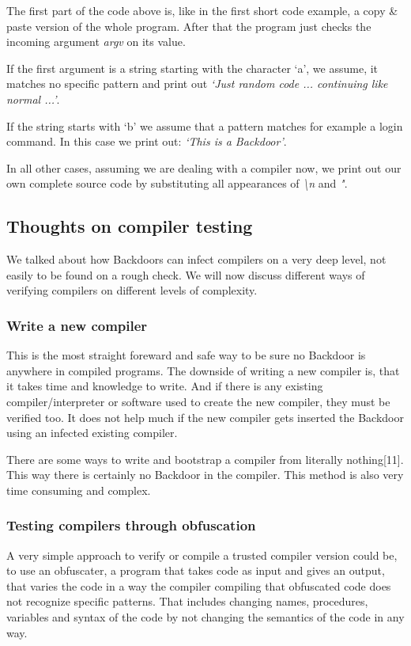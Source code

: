 \documentclass[a4paper, 12pt]{article}
\begin{document}
The first part of the code above is, like in the first short code example, a copy \& paste version of the whole program. After that the program just checks the incoming argument \emph{argv} on its value.

If the first argument is a string starting with the character `a', we assume, it matches no specific pattern and print out \emph{`Just random code ... continuing like normal ...'}.

If the string starts with `b' we assume that a pattern matches for example a login command. In this case we print out: \emph{`This is a Backdoor'}.

In all other cases, assuming we are dealing with a compiler now, we print out our own complete source code by substituting all appearances of \emph{\textbackslash n} and \emph{"}.

\subsection{Thoughts on compiler testing}

We talked about how Backdoors can infect compilers on a very deep level, not easily to be found on a rough check. We will now discuss different ways of verifying compilers on different levels of complexity.

\subsubsection{Write a new compiler}

This is the most straight foreward and safe way to be sure no Backdoor is anywhere in compiled programs. The downside of writing a new compiler is, that it takes time and knowledge to write. And if there is any existing compiler/interpreter or software used to create the new compiler, they must be verified too. It does not help much if the new compiler gets inserted the Backdoor using an infected existing compiler.

There are some ways to write and bootstrap a compiler from literally nothing[11]. This way there is certainly no Backdoor in the compiler. This method is also very time consuming and complex.

\subsubsection{Testing compilers through obfuscation}

A very simple approach to verify or compile a trusted compiler version could be, to use an obfuscater, a program that takes code as input and gives an output, that varies the code in a way the compiler compiling that obfuscated code does not recognize specific patterns. That includes changing names, procedures, variables and syntax of the code by not changing the semantics of the code in any way.
\end{document}
